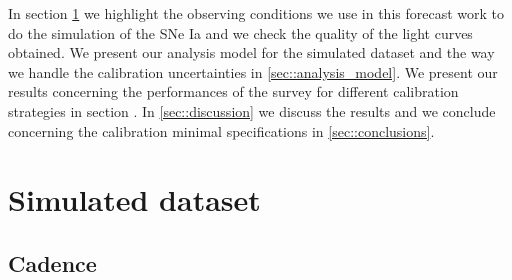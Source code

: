 \documentclass[\docopts]{\docclass}
\begin{document}
In section \ref{sec::simulated_dataset} we highlight the observing conditions we use in this forecast work to do the simulation of the SNe Ia and we check the quality of the light curves obtained.
We present our analysis model for the simulated dataset and the way we handle the calibration uncertainties in \ref{sec::analysis_model}.
We present our results concerning the performances of the survey for different calibration strategies in section .
In \ref{sec::discussion} we discuss the results and we conclude concerning the calibration minimal specifications in \ref{sec::conclusions}.





\section{Simulated dataset}
\label{sec::simulated_dataset}

\subsection{Cadence}
\label{subsec::cadence}
\end{document}
